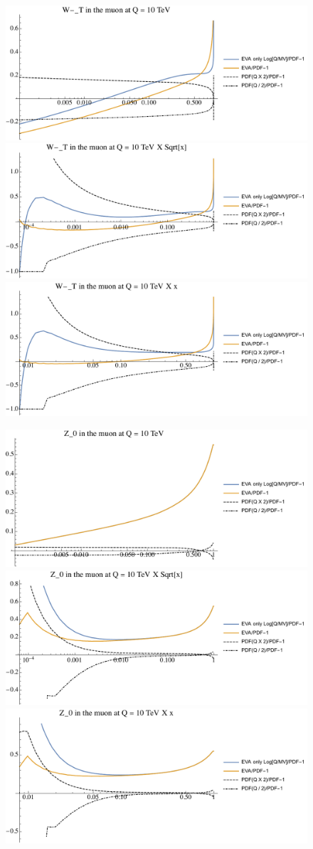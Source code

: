 \documentclass[a4paper,11pt]{article}
\begin{document}
\begin{figure}[ht]
\includegraphics[width=0.4\linewidth]{PlotPDFs/ratios/10TeV/W-_T_Q.pdf}
\includegraphics[width=0.4\linewidth]{PlotPDFs/ratios/10TeV/W-_T_Qsqrtx.pdf}
\includegraphics[width=0.4\linewidth]{PlotPDFs/ratios/10TeV/W-_T_Qx.pdf}
\end{figure}

\begin{figure}[ht]
\includegraphics[width=0.4\linewidth]{PlotPDFs/ratios/10TeV/Z_0_Q.pdf}
\includegraphics[width=0.4\linewidth]{PlotPDFs/ratios/10TeV/Z_0_Qsqrtx.pdf}
\includegraphics[width=0.4\linewidth]{PlotPDFs/ratios/10TeV/Z_0_Qx.pdf}
\end{figure}
\end{document}
